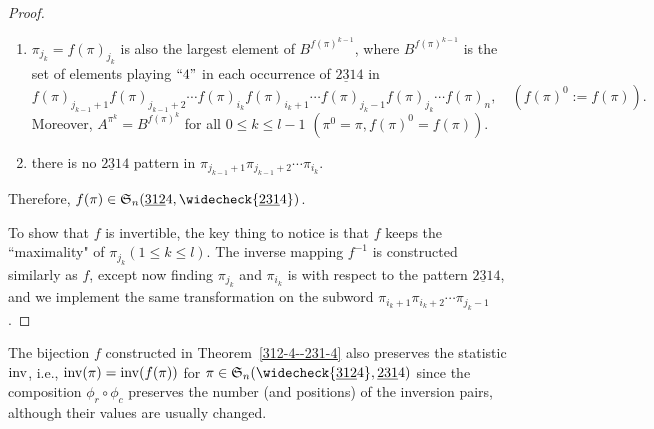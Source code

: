 \begin{proof}
\begin{enumerate}[label=(\roman*)]
      \item $\pi_{j_k}=f(\pi)_{j_k}$ is also the largest element of $B^{f(\pi)^{k-1}}$, where
      $B^{f(\pi)^{k-1}}$ is        
      the set of elements playing $``4"$ in each occurrence of $\underline{231}4$ in
      $$f(\pi)_{j_{k-1}+1}f(\pi)_{j_{k-1}+2}\cdots f(\pi)_{i_k} f(\pi)_{i_k+1}\cdots f(\pi)_{j_k-1} f(\pi)_{j_k}\cdots f(\pi)_n,\quad (f(\pi)^0:=f(\pi)).
      $$
      Moreover, $A^{\pi^k}=B^{f(\pi)^{k}}$ for all $0\le k \le l-1$ $(\pi^0=\pi,f(\pi)^{0}=f(\pi))$.
      \item there is no $\underline{231}4$ pattern in $\pi_{j_{k-1}+1}\pi_{j_{k-1}+2}\cdots \pi_{i_{k}}$.
  \end{enumerate}
  Therefore, $f(\pi)\in \S_n(\underline{312}4,\widecheck{\underline{231}4})$.

  To show that $f$ is invertible, the key thing to notice is that $f$ keeps the ``maximality" of $\pi_{j_k}(1\le k \le l)$. The inverse mapping $f^{-1}$ is constructed similarly as $f$, except now finding $\pi_{j_k}$ and $\pi_{i_k}$ is with respect to the pattern $\underline{231}4$,
  and we implement the same transformation on the subword $\pi_{i_k+1}\pi_{i_k+2}\cdots \pi_{j_{k}-1}$.
\end{proof}

\begin{remark}
  The bijection $f$ constructed in Theorem~\ref{312-4--231-4} also preserves the statistic $\mathrm{inv} $,
  i.e., $\mathrm{inv} (\pi)=\mathrm{inv} (f(\pi))$ for $\pi \in \S_n(\widecheck{\underline{312}4},\underline{231}4)$ since the composition $\phi_r\circ\phi_c$ preserves the number (and positions) of the inversion pairs, although their values are usually changed.
\end{remark}

